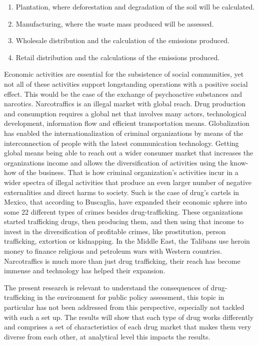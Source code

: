 \begin{enumerate}
\item Plantation, where deforestation and degradation of the soil will be calculated.
\item Manufacturing, where the waste mass produced will be assessed.
\item Wholesale distribution and the calculation of the emissions produced.
\item Retail distribution and the calculations of the emissions produced.
\end{enumerate}

Economic activities are essential for the subsistence of social communities, yet not all of these activities support longstanding operations with a positive social effect. This would be the case of the exchange of psychoactive substances and narcotics. Narcotraffics is an illegal market with global reach. Drug production and consumption requires a global net that involves many actors, technological development, information flow and efficient transportation means. Globalization has enabled the internationalization of criminal organizations by means of the interconnection of people with the latest communication technology. Getting global means being able to reach out a wider consumer market that increases the organizations income and allows the diversification of activities using the know-how of the business. That is how criminal organization's activities incur in a wider spectra of illegal activities that produce an even larger number of negative externalities and direct harms to society. Such is the case of drug's cartels in Mexico, that according to Buscaglia, have expanded their economic sphere into some 22 different types of crimes besides drug-trafficking. These organizations started trafficking drugs, then producing them, and then using that income to invest in the diversification of profitable crimes, like prostitution, person trafficking, extortion or kidnapping. In the Middle East, the Talibans use heroin money to finance religious and petroleum wars with Western countries. Narcotraffics is much more than just drug trafficking, their reach has become immense and technology has helped their expansion. 

The present research is relevant to understand the consequences of drug-trafficking in the environment for public policy assessment, this topic in particular has not been addressed from this perspective, especially not tackled with such a set up. The results will show that each type of drug works differently and comprises a set of characteristics of each drug market that makes them very diverse from each other, at analytical level this impacts the results.


